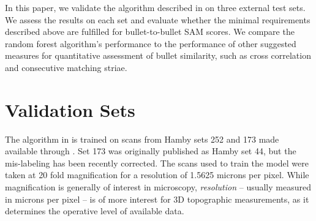 \documentclass[doubleblind]{elsarticle}\usepackage[]{graphicx}\usepackage[]{color}
\begin{document}
In this paper, we validate the algorithm described in \citet{aoas2} on three external test sets. We assess the results on each set and evaluate whether the minimal requirements described above are fulfilled for bullet-to-bullet SAM scores. We compare the random forest algorithm's performance to the performance of other suggested measures for quantitative assessment of bullet similarity, such as cross correlation and consecutive matching striae. 

\section{Validation Sets}

The algorithm in \citet{aoas2} is trained on scans from Hamby sets 252 and 173 made available through \citet{nist}. Set 173 was originally published as Hamby set 44, but the mis-labeling has been recently corrected. The scans used to train the model were taken at 20 fold magnification for a resolution of 1.5625 microns per pixel. While magnification is generally of interest in microscopy, \emph{resolution} -- usually measured in microns per pixel -- is of more interest for 3D topographic measurements, as it determines the operative level of available data.
\end{document}
